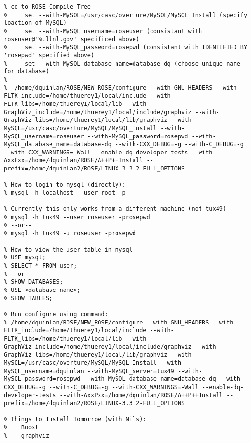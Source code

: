 {\begin{verbatim}
% cd to ROSE Compile Tree
%     set --with-MySQL=/usr/casc/overture/MySQL/MySQL_Install (specify loaction of MySQL)
%     set --with-MySQL_username=roseuser (consistant with roseuser@'%.llnl.gov' specificed above)
%     set --with-MySQL_password=rosepwd (consistant with IDENTIFIED BY 'rosepwd' specified above)
%     set --with-MySQL_database_name=database-dq (choose unique name for database)
%
%  /home/dquinlan/ROSE/NEW_ROSE/configure --with-GNU_HEADERS --with-FLTK_include=/home/thuerey1/local/include --with-FLTK_libs=/home/thuerey1/local/lib --with-GraphViz_include=/home/thuerey1/local/include/graphviz --with-GraphViz_libs=/home/thuerey1/local/lib/graphviz --with-MySQL=/usr/casc/overture/MySQL/MySQL_Install --with-MySQL_username=roseuser --with-MySQL_password=rosepwd --with-MySQL_database_name=database-dq --with-CXX_DEBUG=-g --with-C_DEBUG=-g --with-CXX_WARNINGS=-Wall --enable-dq-developer-tests --with-AxxPxx=/home/dquinlan/ROSE/A++P++Install --prefix=/home/dquinlan2/ROSE/LINUX-3.3.2-FULL_OPTIONS

% How to login to mysql (directly):
% mysql -h localhost --user root -p

% Currently this only works from a different machine (not tux49)
% mysql -h tux49 --user roseuser -prosepwd
% --or--
% mysql -h tux49 -u roseuser -prosepwd

% How to view the user table in mysql
% USE mysql;
% SELECT * FROM user;
% --or--
% SHOW DATABASES;
% USE <database name>;
% SHOW TABLES;

% Run configure using command:
% /home/dquinlan/ROSE/NEW_ROSE/configure --with-GNU_HEADERS --with-FLTK_include=/home/thuerey1/local/include --with-FLTK_libs=/home/thuerey1/local/lib --with-GraphViz_include=/home/thuerey1/local/include/graphviz --with-GraphViz_libs=/home/thuerey1/local/lib/graphviz --with-MySQL=/usr/casc/overture/MySQL/MySQL_Install --with-MySQL_username=dquinlan --with-MySQL_server=tux49 --with-MySQL_password=rosepwd --with-MySQL_database_name=database-dq --with-CXX_DEBUG=-g --with-C_DEBUG=-g --with-CXX_WARNINGS=-Wall --enable-dq-developer-tests --with-AxxPxx=/home/dquinlan/ROSE/A++P++Install --prefix=/home/dquinlan2/ROSE/LINUX-3.3.2-FULL_OPTIONS

% Things to Install Tomorrow (with Nils):
%    Boost
%    graphviz

\end{verbatim}
} %


